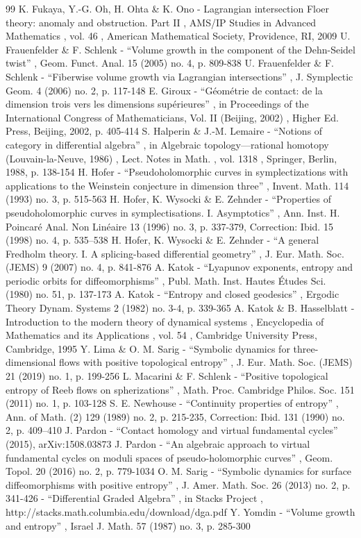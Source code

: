 \begin{thebibliography}{99}
 K. Fukaya, Y.-G. Oh, H. Ohta \& K. Ono - Lagrangian intersection Floer theory: anomaly and obstruction. Part II , AMS/IP Studies in Advanced Mathematics , vol. 46 , American Mathematical Society, Providence, RI, 2009
 U. Frauenfelder \& F. Schlenk - “Volume growth in the component of the Dehn-Seidel twist” , Geom. Funct. Anal. 15 (2005) no. 4, p. 809-838
 U. Frauenfelder \& F. Schlenk - “Fiberwise volume growth via Lagrangian intersections” , J. Symplectic Geom. 4 (2006) no. 2, p. 117-148
 E. Giroux - “Géométrie de contact: de la dimension trois vers les dimensions supérieures” , in Proceedings of the International Congress of Mathematicians, Vol. II (Beijing, 2002) , Higher Ed. Press, Beijing, 2002, p. 405-414
 S. Halperin \& J.-M. Lemaire - “Notions of category in differential algebra” , in Algebraic topology—rational homotopy (Louvain-la-Neuve, 1986) , Lect. Notes in Math. , vol. 1318 , Springer, Berlin, 1988, p. 138-154
 H. Hofer - “Pseudoholomorphic curves in symplectizations with applications to the Weinstein conjecture in dimension three” , Invent. Math. 114 (1993) no. 3, p. 515-563
 H. Hofer, K. Wysocki \& E. Zehnder - “Properties of pseudoholomorphic curves in symplectisations. I. Asymptotics” , Ann. Inst. H. Poincaré Anal. Non Linéaire 13 (1996) no. 3, p. 337-379, Correction: Ibid. 15 (1998) no. 4, p. 535–538
 H. Hofer, K. Wysocki \& E. Zehnder - “A general Fredholm theory. I. A splicing-based differential geometry” , J. Eur. Math. Soc. (JEMS) 9 (2007) no. 4, p. 841-876
 A. Katok - “Lyapunov exponents, entropy and periodic orbits for diffeomorphisms” , Publ. Math. Inst. Hautes Études Sci. (1980) no. 51, p. 137-173
 A. Katok - “Entropy and closed geodesics” , Ergodic Theory Dynam. Systems 2 (1982) no. 3-4, p. 339-365
 A. Katok \& B. Hasselblatt - Introduction to the modern theory of dynamical systems , Encyclopedia of Mathematics and its Applications , vol. 54 , Cambridge University Press, Cambridge, 1995
 Y. Lima \& O. M. Sarig - “Symbolic dynamics for three-dimensional flows with positive topological entropy” , J. Eur. Math. Soc. (JEMS) 21 (2019) no. 1, p. 199-256
 L. Macarini \& F. Schlenk - “Positive topological entropy of Reeb flows on spherizations” , Math. Proc. Cambridge Philos. Soc. 151 (2011) no. 1, p. 103-128
 S. E. Newhouse - “Continuity properties of entropy” , Ann. of Math. (2) 129 (1989) no. 2, p. 215-235, Correction: Ibid. 131 (1990) no. 2, p. 409–410
 J. Pardon - “Contact homology and virtual fundamental cycles” (2015), arXiv:1508.03873
 J. Pardon - “An algebraic approach to virtual fundamental cycles on moduli spaces of pseudo-holomorphic curves” , Geom. Topol. 20 (2016) no. 2, p. 779-1034
 O. M. Sarig - “Symbolic dynamics for surface diffeomorphisms with positive entropy” , J. Amer. Math. Soc. 26 (2013) no. 2, p. 341-426
 - “Differential Graded Algebra” , in Stacks Project , http://stacks.math.columbia.edu/download/dga.pdf
 Y. Yomdin - “Volume growth and entropy” , Israel J. Math. 57 (1987) no. 3, p. 285-300
\end{thebibliography}

